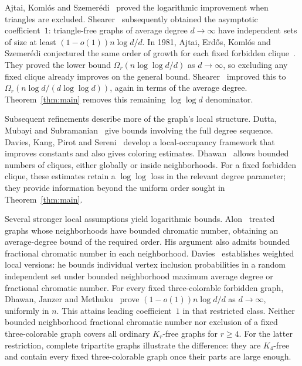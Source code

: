 \documentclass[11pt]{article}
\theoremstyle{definition}
\theoremstyle{remark}
\numberwithin{equation}{section}
\begin{document}
Ajtai, Koml\'os and Szemer\'edi~\cite{AKS1980} proved the logarithmic
improvement when triangles are excluded.
Shearer~\cite{Shearer1983} subsequently obtained the asymptotic
coefficient~$1$: triangle-free graphs of average degree $d\to\infty$
have independent sets of size at least $(1-o(1))n\log d/d$.
In 1981, Ajtai, Erd\H os, Koml\'os and Szemer\'edi conjectured the same
order of growth for each fixed forbidden clique~\cite[p.~314, Equation~(3)]{AEKS1981}.
They proved the lower bound $\Omega_r(n\log\log d/d)$ as $d\to\infty$,
so excluding any fixed clique already improves on the general bound.
Shearer~\cite[Corollary~2]{Shearer1995} improved this to
$\Omega_r(n\log d/(d\log\log d))$, again in terms of the average
degree. Theorem~\ref{thm:main} removes this remaining $\log\log d$
denominator.

Subsequent refinements describe more of the graph's local structure.
Dutta, Mubayi and Subramanian~\cite{DMS2012} give bounds involving
the full degree sequence. Davies, Kang, Pirot and
Sereni~\cite[Theorem~30 and Corollary~31]{DKPS2020} develop a local-occupancy
framework that improves constants and also gives coloring estimates.
Dhawan~\cite[Theorems~1.3 and~1.4]{DhawanLocallySparse2026} allows bounded
numbers of cliques, either globally or inside neighborhoods.
For a fixed forbidden clique, these estimates retain a $\log\log$
loss in the relevant degree parameter; they provide information beyond
the uniform order sought in Theorem~\ref{thm:main}.

Several stronger local assumptions yield logarithmic bounds.
Alon~\cite[Theorem~1.1 and the remark following its proof]{Alon1996}
treated graphs whose neighborhoods have
bounded chromatic number, obtaining an average-degree bound of the
required order. His argument also admits bounded fractional chromatic
number in each neighborhood. Davies~\cite[Theorems~1 and~3]{Davies2026}
establishes weighted local versions: he bounds individual vertex
inclusion probabilities in a random independent set under bounded
neighborhood maximum average degree or fractional chromatic number.
For every fixed three-colorable forbidden graph, Dhawan, Janzer and
Methuku~\cite[Theorems~1.4 and~1.6]{DJM2025} prove
$(1-o(1))n\log d/d$ as $d\to\infty$, uniformly in $n$.
This attains leading coefficient~$1$ in that restricted class.
Neither bounded neighborhood fractional chromatic number nor exclusion of a fixed
three-colorable graph covers all ordinary $K_r$-free graphs for $r\ge4$.
For the latter restriction, complete tripartite graphs illustrate the
difference: they are $K_4$-free and contain every fixed three-colorable
graph once their parts are large enough.
\end{document}
